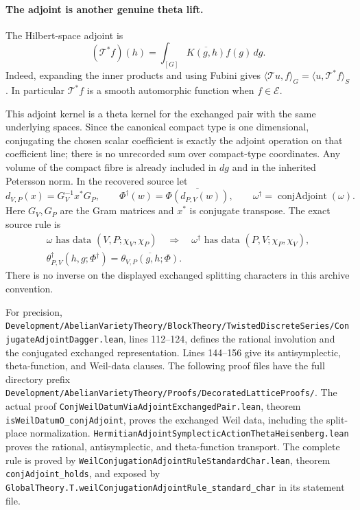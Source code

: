 \paragraph{The adjoint is another genuine theta lift.}
The Hilbert-space adjoint is
\[
 (\mathcal T^*f)(h)
   =\int_{[G]}\overline{K(g,h)}f(g)\,dg.
 \tag{B17b}
\]
Indeed, expanding the inner products and using Fubini gives
$\langle\mathcal T u,f\rangle_G
 =\langle u,\mathcal T^*f\rangle_S$.
In particular $\mathcal T^*f$ is a smooth automorphic function
when $f\in\mathcal E$.

This adjoint kernel is a theta kernel for the exchanged pair with
the same underlying spaces. Since the canonical compact type is
one dimensional, conjugating the chosen scalar coefficient is
exactly the adjoint operation on that coefficient line; there is
no unrecorded sum over compact-type coordinates. Any volume of
the compact fibre is already included in $dg$ and in the
inherited Petersson norm. In the recovered source let
\[
 d_{V,P}(x)=G_V^{-1}x^*G_P,\qquad
 \Phi^\dagger(w)=\overline{\Phi(d_{P,V}(w))},
 \qquad \omega^\dagger=\operatorname{conjAdjoint}(\omega).
\]
Here $G_V,G_P$ are the Gram matrices and $x^*$ is conjugate
transpose. The exact source rule is
\begin{equation}
\begin{gathered}
 \omega\text{ has data }(V,P;\chi_V,\chi_P)
 \quad\Longrightarrow\quad
 \omega^\dagger\text{ has data }(P,V;\chi_P,\chi_V),\\
 \theta_{P,V}^{\dagger}(h,g;\Phi^\dagger)
       =\overline{\theta_{V,P}(g,h;\Phi)}.
\end{gathered}
\tag{B17c}
\end{equation}
There is no inverse on the displayed exchanged splitting
characters in this archive convention.

For precision,
\texttt{Development/\allowbreak{}AbelianVarietyTheory/\allowbreak{}BlockTheory/\allowbreak{}TwistedDiscreteSeries/\allowbreak{}ConjugateAdjointDagger.lean}, lines
112--124, defines the rational involution and the conjugated
exchanged representation. Lines 144--156 give its
antisymplectic, theta-function, and Weil-data clauses.
The following proof files have the full directory prefix
\texttt{Development/\allowbreak{}AbelianVarietyTheory/\allowbreak{}Proofs/\allowbreak{}DecoratedLatticeProofs/}.
The actual proof \texttt{ConjWeilDatumViaAdjointExchangedPair.lean},
theorem \texttt{isWeilDatumO\_conjAdjoint}, proves the exchanged
Weil data, including the split-place normalization.
\texttt{HermitianAdjointSymplecticActionThetaHeisenberg.lean}
proves the rational, antisymplectic, and theta-function
transport. The complete rule is proved by
\texttt{WeilConjugationAdjointRuleStandardChar.lean},
theorem \texttt{conjAdjoint\_holds}, and exposed by
\texttt{GlobalTheory.T.weilConjugationAdjointRule\_standard\_char}
in its statement file.

